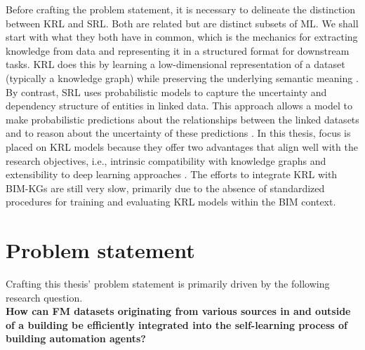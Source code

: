 Before crafting the problem statement, it is necessary to delineate the distinction between \ac{KRL} and \ac{SRL}. Both are related but are distinct subsets of \ac{ML}. We shall start with what they both have in common, which is the mechanics for extracting knowledge from data and representing it in a structured format for downstream tasks. \ac{KRL} does this by learning a low-dimensional representation of a dataset (typically a knowledge graph) while preserving the underlying semantic meaning \citep{Liu2016KnowledgeReview}. By contrast, \ac{SRL} uses probabilistic models to capture the uncertainty and dependency structure of entities in linked data. This approach allows a model to make probabilistic predictions about the relationships between the linked datasets and to reason about the uncertainty of these predictions \citep{Ginestet2010IntroductionLearning}. In this thesis, focus is placed on \ac{KRL} models because they offer two advantages that align well with the research objectives, i.e., intrinsic compatibility with knowledge graphs \citep{Lin2018KnowledgeReview} and extensibility to deep learning approaches \citep{Wang2024LargeSurvey}. The efforts to integrate \ac{KRL} with \acp{BIM-KG} are still very slow, primarily due to the absence of standardized procedures for training and evaluating \ac{KRL} models within the \ac{BIM} context.

\section{Problem statement}
\label{ps}

Crafting this thesis' problem statement is primarily driven by the following research question. \\

\noindent \textbf{How can \ac{FM} datasets originating from various sources in and outside of a building be efficiently integrated into the self-learning process of building automation agents?} \\

